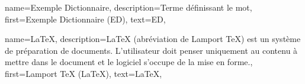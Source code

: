 {
    name={Exemple Dictionnaire},
    description={Terme définissant le mot},
    first={Exemple Dictionnaire (ED)},
    text={ED},
}

{
    name={\LaTeX},
    description={LaTeX (abréviation de Lamport TeX) est un système de préparation de documents. L'utilisateur doit
            penser uniquement au contenu à mettre dans le document et le logiciel s'occupe de la mise en forme.},
    first={Lamport TeX (\LaTeX)},
    text={\LaTeX},
}


